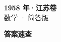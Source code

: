 \documentclass[zihao=-4, a4paper]{ctexart}
\begin{document}
\begin{center}
  {\Large\bfseries 1958 年·江苏卷}\\[4pt]
  {\large 数学 · 简答版}
\end{center}
\medskip
{}

\clearpage
{}
\begin{center}{\Large\bfseries 答案速查}\end{center}
\medskip

\end{document}
